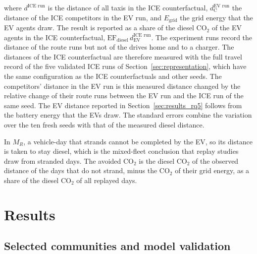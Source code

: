 \documentclass{elsarticle}
\newcommand{\MR}{\ensuremath{M_R}}
\begin{document}
\noindent where \(d^{\text{ICE run}}\) is the distance of all taxis in the ICE counterfactual, \(d_\mathrm{C}^{\text{EV run}}\) the distance of the ICE competitors in the EV run, and \(E_\mathrm{grid}\) the grid energy that the EV agents draw. The result is reported as a share of the diesel CO$_2$ of the EV agents in the ICE counterfactual, \(\mathrm{EF}_\mathrm{diesel}\, d_\mathrm{EV}^{\text{ICE run}}\). The experiment runs record the distance of the route runs but not of the drives home and to a charger. The distances of the ICE counterfactual are therefore measured with the full travel record of the five validated ICE runs of Section~\ref{sec:representation}, which have the same configuration as the ICE counterfactuals and other seeds. The competitors' distance in the EV run is this measured distance changed by the relative change of their route runs between the EV run and the ICE run of the same seed. The EV distance reported in Section~\ref{sec:results_rq5} follows from the battery energy that the EVs draw. The standard errors combine the variation over the ten fresh seeds with that of the measured diesel distance.

In \(\MR\), a vehicle-day that strands cannot be completed by the EV, so its distance is taken to stay diesel, which is the mixed-fleet conclusion that replay studies draw from stranded days. The avoided CO$_2$ is the diesel CO$_2$ of the observed distance of the days that do not strand, minus the CO$_2$ of their grid energy, as a share of the diesel CO$_2$ of all replayed days.


\section{Results}
\label{sec:results}

\subsection{Selected communities and model validation}
\label{sec:results_validation}
\end{document}
